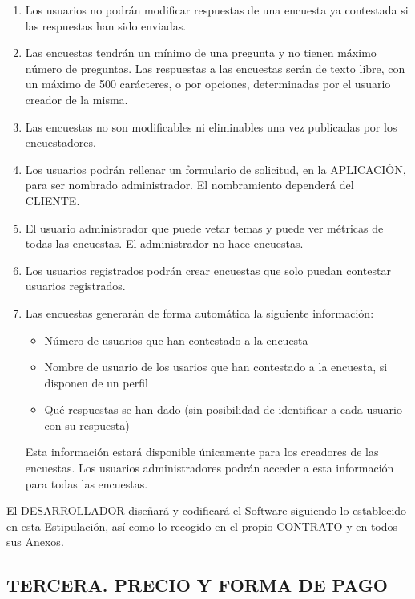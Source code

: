 \documentclass[a4paper,11pt]{report}
\begin{document}
\begin{enumerate}
		\item Los usuarios no podrán modificar respuestas de una encuesta ya
		contestada si las respuestas han sido enviadas.

		\item Las encuestas tendrán un mínimo de una pregunta y no tienen máximo
		número de preguntas. Las respuestas a las encuestas serán de texto libre,
		con un máximo de 500 carácteres, o por opciones, determinadas por el usuario
		creador de la misma.

		\item Las encuestas no son modificables ni eliminables una vez publicadas
		por los encuestadores.

		\item Los usuarios podrán rellenar un formulario de solicitud, en la
		APLICACIÓN, para ser nombrado administrador. El nombramiento dependerá del
		CLIENTE.

		\item El usuario administrador que puede vetar temas y puede ver métricas
		de todas las encuestas. El administrador no hace encuestas.

		\item Los usuarios registrados podrán crear encuestas que solo puedan
		contestar usuarios registrados.

		\item Las encuestas generarán de forma automática la siguiente información:
			\begin{itemize}
				\item Número de usuarios que han contestado a la encuesta
				\item Nombre de usuario de los usarios que han contestado a la encuesta,
				si disponen de un perfil
				\item Qué respuestas se han dado (sin posibilidad de identificar
				a cada usuario con su respuesta)
			\end{itemize}
		Esta información estará disponible únicamente para los creadores de las
		encuestas. Los usuarios administradores podrán acceder a esta información
		para todas las encuestas.
	\end{enumerate}

	El DESARROLLADOR diseñará y codificará el Software siguiendo lo
	establecido en esta Estipulación, así como lo recogido en el propio
	CONTRATO y en todos sus Anexos.

	\subsection*{TERCERA. PRECIO Y FORMA DE PAGO}
\end{document}
